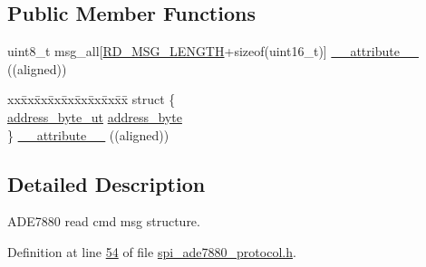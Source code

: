 \subsection*{Public Member Functions}
\begin{DoxyCompactItemize}
\item 
uint8\-\_\-t msg\-\_\-all\mbox{[}\hyperlink{a00041_a0f0795755fb9e8e47c78c1289e091282}{R\-D\-\_\-\-M\-S\-G\-\_\-\-L\-E\-N\-G\-T\-H}+sizeof(uint16\-\_\-t)\mbox{]} \hyperlink{a00013_af2cc7116d869ca36614b10b27053b280}{\-\_\-\-\_\-attribute\-\_\-\-\_\-} ((aligned))
\item 
\begin{tabbing}
xx\=xx\=xx\=xx\=xx\=xx\=xx\=xx\=xx\=\kill
struct \{\\
\>\hyperlink{a00011}{address\_byte\_ut} \hyperlink{a00013_af6a65bac733ea3e9b1d24b065163d49a}{address\_byte}\\
\} \hyperlink{a00013_a71770ee3ec9d2d6ef143d2423ad22be9}{\_\_attribute\_\_} ((aligned))\\

\end{tabbing}\end{DoxyCompactItemize}


\subsection{Detailed Description}
A\-D\-E7880 read cmd msg structure. 

Definition at line \hyperlink{a00041_source_l00054}{54} of file \hyperlink{a00041_source}{spi\-\_\-ade7880\-\_\-protocol.\-h}.



